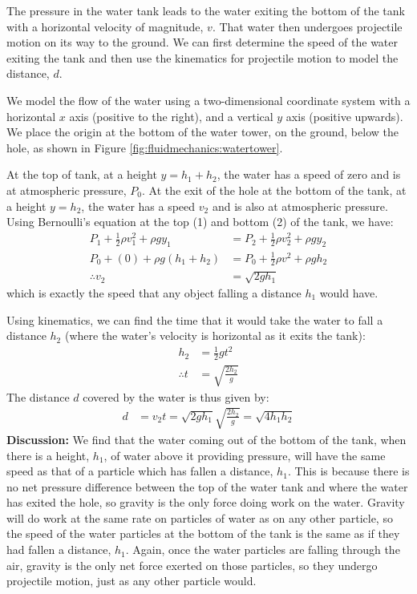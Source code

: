 {{\begin{example}
The pressure in the water tank leads to the water exiting the bottom of the tank with a horizontal velocity of magnitude, $v$. That water then undergoes projectile motion on its way to the ground. We can first determine the speed of the water exiting the tank and then use the kinematics for projectile motion to model the distance, $d$. 

We model the flow of the water using a two-dimensional coordinate system with a horizontal $x$ axis (positive to the right), and a vertical $y$ axis (positive upwards). We place the origin at the bottom of the water tower, on the ground, below the hole, as shown in Figure \ref{fig:fluidmechanics:watertower}.
 
At the top of tank, at a height $y = h_1+h_2$, the water has a speed of zero and is at atmospheric pressure, $P_0$. At the exit of the hole at the bottom of the tank, at a height $y = h_2$, the water has a speed $v_2$ and is also at atmospheric pressure. Using Bernoulli's equation at the top (1) and bottom (2) of the tank, we have:
\begin{align*}
P_1 +\frac{1}{2}\rho v_1^2+ \rho g y_1&= P_2 + \frac{1}{2}\rho v_2^2 + \rho g y_2\\
P_0 + (0) + \rho g (h_1+h_2) &= P_0 +  \frac{1}{2}\rho v^2 + \rho g h_2\\
\therefore v_2 &= \sqrt{2gh_1}
\end{align*}
which is exactly the speed that any object falling a distance $h_1$ would have. 

Using kinematics, we can find the time that it would take the water to fall a distance $h_2$ (where the water's velocity is horizontal as it exits the tank):
\begin{align*}
h_2 &= \frac{1}{2}gt^2\\
\therefore t &= \sqrt{\frac{2h_2}{g}}
\end{align*}
The distance $d$ covered by the water is thus given by:
\begin{align*}
d &= v_2t = \sqrt{2gh_1}\sqrt{\frac{2h_2}{g}} = \sqrt{4h_1h_2}
\end{align*}
\textbf{Discussion:} We find that the water coming out of the bottom of the tank, when there is a height, $h_1$, of water above it providing pressure, will have the same speed as that of a particle which has fallen a distance, $h_1$. This is because there is no net pressure difference between the top of the water tank and where the water has exited the hole, so gravity is the only force doing work on the water. Gravity will do work at the same rate on particles of water as on any other particle, so the speed of the water particles at the bottom of the tank is the same as if they had fallen a distance, $h_1$. Again, once the water particles are falling through the air, gravity is the only net force exerted on those particles, so they undergo projectile motion, just as any other particle would.
\end{example}

}}
